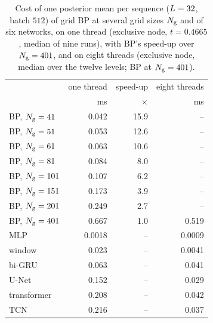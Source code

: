 \begin{table}[t]
\setlength{\tabcolsep}{5pt}
\centering
\small
\caption{Cost of one posterior mean per sequence ($L=32$, batch $512$) of grid BP at several grid sizes $N_{\mathrm{g}}$ and of six networks, on one thread (exclusive node, $t=0.4665$, median of nine runs), with BP's speed-up over $N_{\mathrm{g}}=401$, and on eight threads (exclusive node, median over the twelve levels; BP at $N_{\mathrm{g}}=401$).}
\label{tab:costtime}
\begin{tabular}{@{}lrrr@{}}
\toprule
& one thread & speed-up & eight threads \\
& ms & $\times$ & ms \\
\midrule
BP, $N_{\mathrm{g}}=41$ & 0.042 & 15.9 & -- \\
BP, $N_{\mathrm{g}}=51$ & 0.053 & 12.6 & -- \\
BP, $N_{\mathrm{g}}=61$ & 0.063 & 10.6 & -- \\
BP, $N_{\mathrm{g}}=81$ & 0.084 & 8.0 & -- \\
BP, $N_{\mathrm{g}}=101$ & 0.107 & 6.2 & -- \\
BP, $N_{\mathrm{g}}=151$ & 0.173 & 3.9 & -- \\
BP, $N_{\mathrm{g}}=201$ & 0.249 & 2.7 & -- \\
BP, $N_{\mathrm{g}}=401$ & 0.667 & 1.0 & 0.519 \\
\midrule
MLP & 0.0018 & -- & 0.0009 \\
window & 0.023 & -- & 0.0041 \\
bi-GRU & 0.063 & -- & 0.041 \\
U-Net & 0.152 & -- & 0.029 \\
transformer & 0.208 & -- & 0.042 \\
TCN & 0.216 & -- & 0.037 \\
\bottomrule
\end{tabular}
\end{table}
